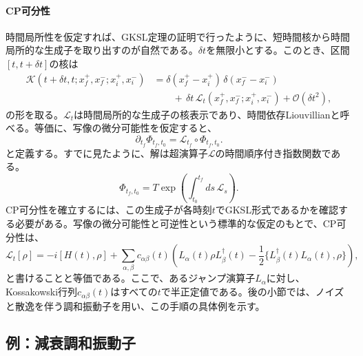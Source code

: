 \documentclass[a4paper,11pt,oneside]{article}
\theoremstyle{definition}
\numberwithin{equation}{section}
\renewcommand{\L}{\mathcal{L}}
\begin{document}
\paragraph{CP可分性} 時間局所性を仮定すれば、GKSL定理の証明で行ったように、短時間核から時間局所的な生成子を取り出すのが自然である。\(\delta t\)を無限小とする。このとき、区間\([t,t+\delta t]\)の核は
\begin{align}
\mathcal K(t+\delta t,t;x_f^+,x_f^-;x_i^+,x_i^-)
&=
\delta(x_f^+-x_i^+)\,\delta(x_f^--x_i^-)
\nonumber\\
&\qquad
+\,
\delta t\,
\mathcal L_t(x_f^+,x_f^-;x_i^+,x_i^-)
+
\mathcal O(\delta t^2) ,
\end{align}
の形を取る。\(\mathcal L_t\)は時間局所的な生成子の核表示であり、時間依存Liouvillianと呼べる。等価に、写像の微分可能性を仮定すると、
\begin{equation}\label{timelocalgeneratorSK}
\partial_{t_f}\Phi_{t_f,t_0}
=
\mathcal L_{t_f}\circ \Phi_{t_f,t_0} .
\end{equation}
と定義する。すでに見たように、解は超演算子$ \L$の時間順序付き指数関数である。
\begin{equation}
\Phi_{t_f,t_0}
=
T\exp\!\left(
\int_{t_0}^{t_f} ds\,\mathcal L_s
\right) .
\end{equation}
CP可分性を確立するには、この生成子が各時刻\(t\)でGKSL形式であるかを確認する必要がある。写像の微分可能性と可逆性という標準的な仮定のもとで、CP可分性は、
\begin{equation}
\mathcal L_t[\rho]
=
-i[H(t),\rho]
+
\sum_{\alpha,\beta} c_{\alpha\beta}(t)
\left(
L_\alpha(t)\rho L_\beta^\dagger(t)
-\frac12\{L_\beta^\dagger(t)L_\alpha(t),\rho\}
\right) ,
\end{equation}
と書けることと等価である。ここで、あるジャンプ演算子$  L_{\alpha} $に対し、Kossakowski行列\(c_{\alpha\beta}(t)\)はすべての\(t\)で半正定値である。後の小節では、ノイズと散逸を伴う調和振動子を用い、この手順の具体例を示す。





\subsection{例：減衰調和振動子}\label{ssec:dampedharmonic}
\end{document}
